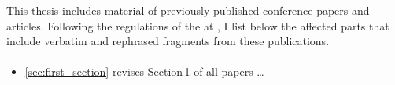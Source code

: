 
\label{ch:PreviousPublications}

This thesis includes material of previously published conference papers and articles. Following the regulations of the \myFaculty at \myUni, I list below the affected parts that include verbatim and rephrased fragments from these publications.

\sloppy

\paragraph{}
\begin{itemize}
    \item \cref{sec:first_section} revises Section\,1 of all papers \dots
\end{itemize}

\fussy

\label{ch:PreviousPublicationsEnd}
